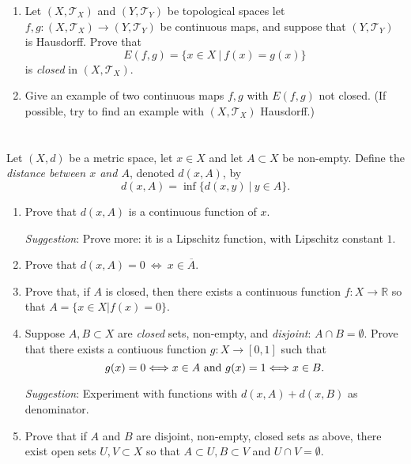 \documentclass{jhwhw}
\newcommand{\R}{{\mathbb R}}
\newcommand{\T}{{\mathcal T}}
\begin{document}
\problem{} %
\begin{enumerate}
	\item Let $(X,\T_X)$ and $(Y,\T_Y)$ be topological spaces let $f,g:(X,\T_X)\to(Y,\T_Y)$ be continuous maps, and suppose that $(Y,\T_Y)$ is Hausdorff.   Prove that
	$$
	E(f,g) = \{x\in X \  | \  f(x) = g(x) \}
	$$
	is \emph{closed} in $(X,\T_X)$.
	\item Give an example of two continuous maps $f,g$ with $E(f,g)$ not closed.  (If possible, try to find an example with $(X,\T_X)$ 
	Hausdorff.)
\end{enumerate}

\solution{}

\part{}

\problem{}%
Let $(X,d)$ be a metric space, let $x\in X$ and let $A\subset X$ be non-empty.  Define the \emph{distance between $x$ and $A$}, denoted $d(x,A)$, by
$$
d(x,A) = \inf \{d(x,y)\  | \  y\in A\}.
$$
\begin{enumerate}
	\item Prove that $d(x,A)$ is a continuous function of $x$. 
	
	\emph{Suggestion}:  Prove more: it is a Lipschitz function, with Lipschitz constant $1$.
	
	\item Prove that $d(x,A) = 0\  \Longleftrightarrow \  x\in\overline{A}$.
	
	\item Prove that, if $A$ is closed, then there exists a continuous function $f:X\to\R$ so that $ A = \{x\in X | f(x) = 0\}$.
	
	
	
	\item Suppose $A,B\subset X$ are \emph{closed} sets, non-empty, and \emph{disjoint}: $A\cap B = \emptyset$. Prove that there exists a contiuous function $g:X\to [0,1]$ such that 
	$$
	g(x) = 0 \Longleftrightarrow x\in A \hbox{ and } g(x) = 1 \Longleftrightarrow x\in B.
	$$
	
	\emph{Suggestion}: Experiment with  functions with $d(x,A) + d(x,B)$ as denominator.
	
	\item Prove that if $A$ and $B$ are disjoint, non-empty, closed sets as above, there exist open sets $U,V\subset X$ so that $A\subset U, B\subset V$ and $U\cap V = \emptyset$.
\end{enumerate}

\solution{}
\part{}
\end{document}
